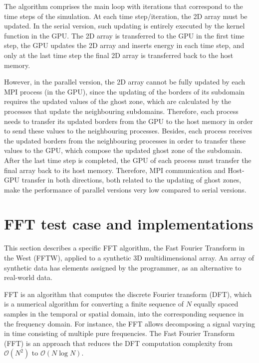 The algorithm comprises the main loop with iterations that correspond to the time steps of the simulation. At each time step/iteration, the 2D array must be updated. In the serial version, such updating is entirely executed by the kernel function in the GPU. The 2D array is transferred to the GPU in the first time step, the GPU updates the 2D array and inserts energy in each time step, and only at the last time step the final 2D array is transferred back to the host memory.

However, in the parallel version, the 2D array cannot be fully updated by each MPI process (in the GPU), since the updating of the borders of its subdomain requires the updated values of the ghost zone, which are calculated by the processes that update the neighbouring subdomains. Therefore, each process needs to transfer its updated borders from the GPU to the host memory in order to send these values to the neighbouring processes. Besides, each process receives the updated borders from the neighbouring processes in order to transfer these values to the GPU, which compose the updated ghost zone of the subdomain. After the last time step is completed, the GPU of each process must transfer the final array back to its host memory. Therefore, MPI communication and Host-GPU transfer in both directions, both related to the updating of ghost zones, make the performance of parallel versions very low compared to serial versions. 

%
%
%
%
%
%
%
\section{FFT test case and implementations}
\label{sec_fft}

This section describes a specific FFT algorithm, the Fast Fourier Transform in the West (FFTW), applied to a synthetic 3D multidimensional array. An array of synthetic data has elements assigned by the programmer, as an alternative to real-world data. 

FFT is an algorithm that computes the discrete Fourier transform (DFT), which is a numerical algorithm for converting a finite sequence of $N$ equally spaced samples in the temporal or spatial domain, into the corresponding sequence in the frequency domain. For instance, the FFT allows decomposing a signal varying in time consisting of multiple pure frequencies. The Fast Fourier Transform (FFT) is an approach that reduces the DFT computation complexity from $\mathcal{O}(N^2)$ to $\mathcal{O}(N\log{}N)$. 
 
